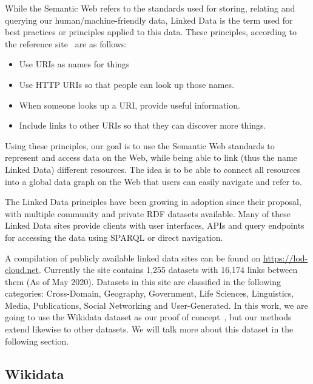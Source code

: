 While the Semantic Web refers to the standards used for storing, relating and querying our human/machine-friendly data, Linked Data is the term used for best practices or principles applied to this data. These principles, according to the reference site~\cite{LinkedData} are as follows:

\begin{itemize}
    \item Use URIs as names for things
    \item Use HTTP URIs so that people can look up those names.
    \item When someone looks up a URI, provide useful information.
    \item Include links to other URIs so that they can discover more things.
\end{itemize}

Using these principles, our goal is to use the Semantic Web standards to represent and access data on the Web, while being able to link (thus the name Linked Data) different resources. The idea is to be able to connect all resources into a global data graph on the Web that users can easily navigate and refer to.

The Linked Data principles have been growing in adoption since their proposal, with multiple community and private RDF datasets available. Many of these Linked Data sites provide clients with user interfaces, APIs and query endpoints for accessing the data using SPARQL or direct navigation. 

A compilation of publicly available linked data sites can be found on \url{https://lod-cloud.net}. Currently the site contains 1,255 datasets with 16,174 links between them (As of May 2020). Datasets in this site are classified in the following categories: Cross-Domain, Geography, Government, Life Sciences, Linguistics, Media, Publications, Social Networking and User-Generated. In this work, we are going to use the Wikidata dataset as our proof of concept~\cite{wikidataQueryService}, but our methods extend likewise to other datasets. We will talk more about this dataset in the following section.


\subsection{Wikidata}

